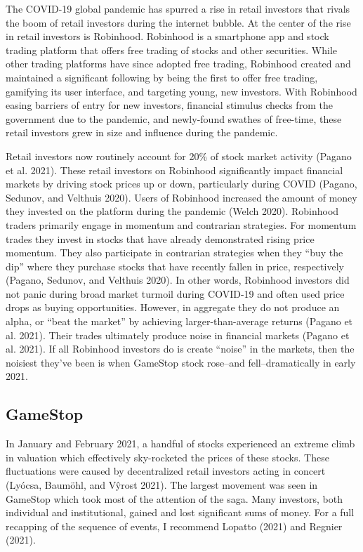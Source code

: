 \documentclass[12pt,]{article}
\begin{document}
The COVID-19 global pandemic has spurred a rise in retail investors that
rivals the boom of retail investors during the internet bubble. At the
center of the rise in retail investors is Robinhood. Robinhood is a
smartphone app and stock trading platform that offers free trading of
stocks and other securities. While other trading platforms have since
adopted free trading, Robinhood created and maintained a significant
following by being the first to offer free trading, gamifying its user
interface, and targeting young, new investors. With Robinhood easing
barriers of entry for new investors, financial stimulus checks from the
government due to the pandemic, and newly-found swathes of free-time,
these retail investors grew in size and influence during the pandemic.

Retail investors now routinely account for 20\% of stock market activity
(Pagano et al. 2021). These retail investors on Robinhood significantly
impact financial markets by driving stock prices up or down,
particularly during COVID (Pagano, Sedunov, and Velthuis 2020). Users of
Robinhood increased the amount of money they invested on the platform
during the pandemic (Welch 2020). Robinhood traders primarily engage in
momentum and contrarian strategies. For momentum trades they invest in
stocks that have already demonstrated rising price momentum. They also
participate in contrarian strategies when they ``buy the dip'' where
they purchase stocks that have recently fallen in price, respectively
(Pagano, Sedunov, and Velthuis 2020). In other words, Robinhood
investors did not panic during broad market turmoil during COVID-19 and
often used price drops as buying opportunities. However, in aggregate
they do not produce an alpha, or ``beat the market'' by achieving
larger-than-average returns (Pagano et al. 2021). Their trades
ultimately produce noise in financial markets (Pagano et al. 2021). If
all Robinhood investors do is create ``noise'' in the markets, then the
noisiest they've been is when GameStop stock rose--and
fell--dramatically in early 2021.

\hypertarget{gamestop}{%
\subsection{GameStop}\label{gamestop}}

In January and February 2021, a handful of stocks experienced an extreme
climb in valuation which effectively sky-rocketed the prices of these
stocks. These fluctuations were caused by decentralized retail investors
acting in concert (Lyócsa, Baumöhl, and Vŷrost 2021). The largest
movement was seen in GameStop which took most of the attention of the
saga. Many investors, both individual and institutional, gained and lost
significant sums of money. For a full recapping of the sequence of
events, I recommend Lopatto (2021) and Regnier (2021).
\end{document}
